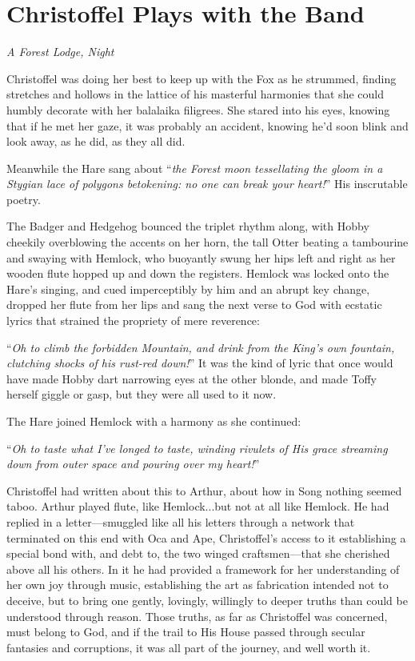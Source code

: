 \documentclass[11pt,a5paper]{article}
\newcommand{\alet}[1]{\textit{#1}\vspace{1em}}
\begin{document}
\newpage

\section{Christoffel Plays with the Band}

\alet{A Forest Lodge, Night}


Christoffel was doing her best to keep up with the Fox as he strummed, finding stretches and hollows in the lattice of his masterful harmonies that she could humbly decorate with her balalaika filigrees. She stared into his eyes, knowing that if he met her gaze, it was probably an accident, knowing he'd soon blink and look away, as he did, as they all did.

Meanwhile the Hare sang about ``\emph{the Forest moon tessellating the gloom in a Stygian lace of polygons betokening: no one can break your heart!}'' His inscrutable poetry.

The Badger and Hedgehog bounced the triplet rhythm along, with Hobby cheekily overblowing the accents on her horn, the tall Otter beating a tambourine and swaying with Hemlock, who buoyantly swung her hips left and right as her wooden flute hopped up and down the registers. Hemlock was locked onto the Hare's singing, and cued imperceptibly by him and an abrupt key change, dropped her flute from her lips and sang the next verse to God with ecstatic lyrics that strained the propriety of mere reverence:

``\emph{Oh to climb the forbidden Mountain, and drink from the King's own fountain, clutching shocks of his rust-red down!}'' It was the kind of lyric that once would have made Hobby dart narrowing eyes at the other blonde, and made Toffy herself giggle or gasp, but they were all used to it now.

The Hare joined Hemlock with a harmony as she continued:

``\emph{Oh to taste what I've longed to taste, winding rivulets of His grace streaming down from outer space and pouring over my heart!}''

Christoffel had written about this to Arthur, about how in Song nothing seemed taboo. Arthur played flute, like Hemlock...but not at all like Hemlock. He had replied in a letter---smuggled like all his letters through a network that terminated on this end with Oca and Ape, Christoffel's access to it establishing a special bond with, and debt to, the two winged craftsmen---that she cherished above all his others. In it he had provided a framework for her understanding of her own joy through music, establishing the art as fabrication intended not to deceive, but to bring one gently, lovingly, willingly to deeper truths than could be understood through reason. Those truths, as far as Christoffel was concerned, must belong to God, and if the trail to His House passed through secular fantasies and corruptions, it was all part of the journey, and well worth it.
\end{document}
